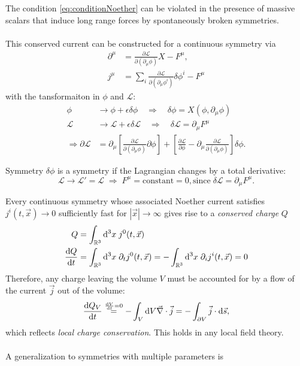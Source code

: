 The condition \ref{eq:conditionNoether} can be violated in the presence of massive scalars that induce long range forces by spontaneously broken symmetries.\\
\\
This conserved current can be constructed for a continuous symmetry via
\begin{align}
\partial^{\mu} &= \frac{\partial \mathcal{L}}{\partial(\partial_{\mu}\phi)} X - F^{\mu}, \\
j^{\mu} &= \sum_i  \frac{\partial \mathcal{L}}{\partial(\partial_{\mu} \phi^i)} \delta \phi^i - F^{\mu}
\end{align}
with the tansformaiton in $\phi$ and $\mathcal{L}$:
\begin{align}
\phi &\rightarrow \phi + \epsilon \delta \phi \quad \Rightarrow \quad \delta \phi =X(\phi,\partial_{\mu}\phi) \\
\mathcal{L} & \rightarrow \mathcal{L}+\epsilon \delta \mathcal{L} \quad \Rightarrow \quad \delta \mathcal{L}=\partial_{\mu}F^{\mu}\\
\Rightarrow \partial \mathcal{L} &= \partial_{\mu} \left[\frac{\partial \mathcal{L}}{\partial(\partial_{\mu}\phi)} \partial \phi \right] + \left[\frac{\partial \mathcal{L}}{\partial \phi} - \partial_{\mu} \frac{\partial \mathcal{L}}{\partial(\partial_{\mu}\phi)}\right] \delta \phi.
\end{align}
\begin{mybox}{Symmetry}
	$\delta \phi$ is a symmetry if the Lagrangian changes by a total derivative:
	\begin{equation}
	\mathcal{L} \rightarrow \mathcal{L}'=\mathcal{L} \; \Rightarrow \; F^{\mu} = \mathrm{constant} =0, \mathrm{since} \;\delta\mathcal{L}=\partial_{\mu}F^{\mu}.
	\end{equation}
\end{mybox}
Every continuous symmetry whose associated Noether current satisfies $j^i(t,\vec{x}) \rightarrow0$ sufficiently fast for $|\vec{x}|\rightarrow\infty$ gives rise to a \emph{conserved charge} $Q$ 
\begin{align}
 \label{eq:conservationNoether}
Q&=\int_{\mathbb{R}^3} \mathrm{d}^3 x \; j^0 (t,\vec{x})\\
\frac{\mathrm{d} Q}{\mathrm{d} t} &= \int_{\mathbb{R}^3} \mathrm{d}^3x \;  \partial_t j^0(t,\vec{x}) = -\int_{\mathbb{R}^3} \mathrm{d}^3x \; \partial_i j^i(t,\vec{x}) = 0 
\end{align}
Therefore, any charge leaving the volume $V$ must be accounted for by a flow of the current $\vec{j}$ out of the volume:
\begin{equation}
\frac{\mathrm{d} Q_V}{\mathrm{d} t} \stackrel{\frac{\mathrm{d} V}{\mathrm{d} t}=0}{=} -\int_V \mathrm{d} V \vec{\nabla}\cdot \vec{j} = - \int_{\partial V} \vec{j}\cdot \mathrm{d} \vec{s},
\end{equation}
which reflects \emph{local charge conservation}. This holds in any local field theory.
\\
\\
A generalization to symmetries with multiple parameters is

